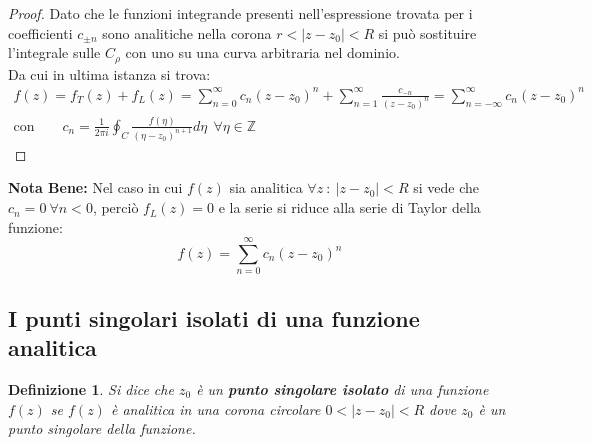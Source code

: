 \documentclass[twoside]{article}
\newtheorem{definition}{Definizione}[section]
\begin{document}
\begin{proof}
Dato che le funzioni integrande presenti nell'espressione trovata per i coefficienti $c_{\pm n}$ sono analitiche nella corona $r<|z-z_0|<R$ si può sostituire l'integrale sulle $C_{\rho}$ con uno su una curva arbitraria nel dominio.
\\
Da cui in ultima istanza si trova:
\begin{equation} \begin{split}
    f(z)=f_T(z)+f_L(z)=\sum_{n=0}^{\infty}c_n(z-z_0)^n+\sum_{n=1}^{\infty} \frac{c_{-n}}{(z-z_0)^n}=\sum_{n=-\infty}^{\infty}c_n(z-z_0)^n \\ \text{con} \ \ \ \ \ \ \ \ \ c_n=\frac{1}{2\pi i} \oint_{C}\frac{f(\eta)}{(\eta-z_0)^{n+1}}d\eta \ \ \forall \eta \in \mathds{Z}
\end{split}\end{equation}
\end{proof}

\textbf{Nota Bene:} Nel caso in cui $f(z)$ sia analitica $\forall z \ : \ |z-z_0|<R$ si vede che $c_n=0 \ \forall n <0$, perciò $f_L(z)=0$ e la serie si riduce alla serie di Taylor della funzione:
\begin{equation}
    f(z)=\sum_{n=0}^{\infty}c_n(z-z_0)^n
\end{equation}

\subsection{I punti singolari isolati di una funzione analitica}

\begin{definition}
Si dice che $z_0$ è un \textbf{punto singolare isolato} di una funzione $f(z)$ se $f(z)$ è analitica in una corona circolare $0<|z-z_0|<R$ dove $z_0$ è un punto singolare della funzione.
\end{definition}

\begin{center}
\end{center}
\end{document}
